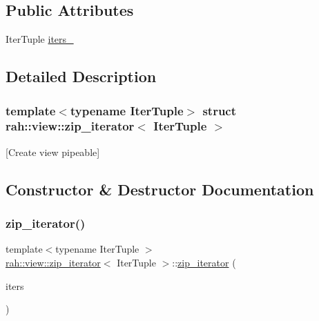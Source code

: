 \subsection*{Public Attributes}
\begin{DoxyCompactItemize}
\item 
Iter\+Tuple \mbox{\hyperlink{structrah_1_1view_1_1zip__iterator_a58f5f6dd935fe51dd3c3a28e3b06ecc9}{iters\+\_\+}}
\end{DoxyCompactItemize}


\subsection{Detailed Description}
\subsubsection*{template$<$typename Iter\+Tuple$>$\newline
struct rah\+::view\+::zip\+\_\+iterator$<$ Iter\+Tuple $>$}

\mbox{[}Create view pipeable\mbox{]} 

\subsection{Constructor \& Destructor Documentation}
\mbox{\label{structrah_1_1view_1_1zip__iterator_a2f6b7c790bcb819a68e4828f6bd6ef79}} 
\subsubsection{\texorpdfstring{zip\_iterator()}{zip\_iterator()}}
{\footnotesize\ttfamily template$<$typename Iter\+Tuple $>$ \\
\mbox{\hyperlink{structrah_1_1view_1_1zip__iterator}{rah\+::view\+::zip\+\_\+iterator}}$<$ Iter\+Tuple $>$\+::\mbox{\hyperlink{structrah_1_1view_1_1zip__iterator}{zip\+\_\+iterator}} (\begin{DoxyParamCaption}\item[{Iter\+Tuple const \&}]{iters }\end{DoxyParamCaption})\hspace{0.3cm}{\ttfamily [inline]}}



